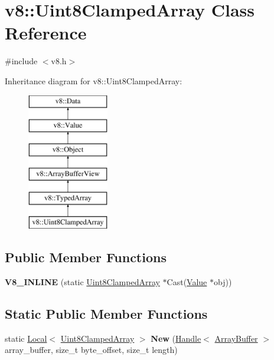 \hypertarget{classv8_1_1_uint8_clamped_array}{}\section{v8\+:\+:Uint8\+Clamped\+Array Class Reference}
\label{classv8_1_1_uint8_clamped_array}


{\ttfamily \#include $<$v8.\+h$>$}

Inheritance diagram for v8\+:\+:Uint8\+Clamped\+Array\+:\begin{figure}[H]
\begin{center}
\leavevmode
\includegraphics[height=6.000000cm]{classv8_1_1_uint8_clamped_array}
\end{center}
\end{figure}
\subsection*{Public Member Functions}
\begin{DoxyCompactItemize}
\item 
\hypertarget{classv8_1_1_uint8_clamped_array_ab129afb47932f93e1ca513828124ea70}{}{\bfseries V8\+\_\+\+I\+N\+L\+I\+N\+E} (static \hyperlink{classv8_1_1_uint8_clamped_array}{Uint8\+Clamped\+Array} $\ast$Cast(\hyperlink{classv8_1_1_value}{Value} $\ast$obj))\label{classv8_1_1_uint8_clamped_array_ab129afb47932f93e1ca513828124ea70}

\end{DoxyCompactItemize}
\subsection*{Static Public Member Functions}
\begin{DoxyCompactItemize}
\item 
\hypertarget{classv8_1_1_uint8_clamped_array_ac1979cc1d0591a35e412a0fde9572667}{}static \hyperlink{classv8_1_1_local}{Local}$<$ \hyperlink{classv8_1_1_uint8_clamped_array}{Uint8\+Clamped\+Array} $>$ {\bfseries New} (\hyperlink{classv8_1_1_handle}{Handle}$<$ \hyperlink{classv8_1_1_array_buffer}{Array\+Buffer} $>$ array\+\_\+buffer, size\+\_\+t byte\+\_\+offset, size\+\_\+t length)\label{classv8_1_1_uint8_clamped_array_ac1979cc1d0591a35e412a0fde9572667}

\end{DoxyCompactItemize}


